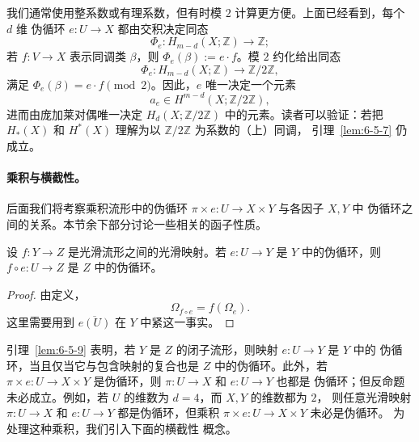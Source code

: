 \begin{remark}[模 $2$ 系数]\label{rem:6-5-8}
我们通常使用整系数或有理系数，但有时模 $2$ 计算更方便。上面已经看到，每个 $d$ 维
伪循环 $e:U\to X$ 都由交积决定同态
\[
  \Phi_e:H_{m-d}(X;\mathbb Z)\longrightarrow\mathbb Z;
\]
若 $f:V\to X$ 表示同调类 $\beta$，则 $\Phi_e(\beta):=e\cdot f$。模 $2$ 约化给出同态
\[
  \Phi_e:H_{m-d}(X;\mathbb Z)\longrightarrow\mathbb Z/2\mathbb Z,
\]
满足 $\Phi_e(\beta)=e\cdot f\pmod2$。因此，$e$ 唯一决定一个元素
\[
  a_e\in H^{m-d}(X;\mathbb Z/2\mathbb Z),
\]
进而由庞加莱对偶唯一决定 $H_d(X;\mathbb Z/2\mathbb Z)$ 中的元素。读者可以验证：若把
$H_*(X)$ 和 $H^*(X)$ 理解为以 $\mathbb Z/2\mathbb Z$ 为系数的（上）同调，
引理~\ref{lem:6-5-7} 仍成立。
\end{remark}

\paragraph{乘积与横截性。}
后面我们将考察乘积流形中的伪循环 $\pi\times e:U\to X\times Y$ 与各因子 $X,Y$ 中
伪循环之间的关系。本节余下部分讨论一些相关的函子性质。

\begin{lemma}\label{lem:6-5-9}
设 $f:Y\to Z$ 是光滑流形之间的光滑映射。若 $e:U\to Y$ 是 $Y$ 中的伪循环，则
$f\circ e:U\to Z$ 是 $Z$ 中的伪循环。
\end{lemma}

\begin{proof}
由定义，
\[
  \Omega_{f\circ e}=f(\Omega_e).
\]
这里需要用到 $\overline{e(U)}$ 在 $Y$ 中紧这一事实。
\end{proof}

引理~\ref{lem:6-5-9} 表明，若 $Y$ 是 $Z$ 的闭子流形，则映射 $e:U\to Y$ 是 $Y$ 中的
伪循环，当且仅当它与包含映射的复合也是 $Z$ 中的伪循环。此外，若
$\pi\times e:U\to X\times Y$ 是伪循环，则 $\pi:U\to X$ 和 $e:U\to Y$ 也都是
伪循环；但反命题未必成立。例如，若 $U$ 的维数为 $d=4$，而 $X,Y$ 的维数都为 $2$，
则任意光滑映射 $\pi:U\to X$ 和 $e:U\to Y$ 都是伪循环，但乘积
$\pi\times e:U\to X\times Y$ 未必是伪循环。
为处理这种乘积，我们引入下面的横截性
概念。

